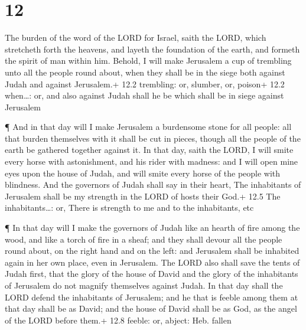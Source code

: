 \hypertarget{section-11}{%
\section{12}\label{section-11}}

 The burden of the word of the LORD for Israel, saith the
LORD, which stretcheth forth the heavens, and layeth the foundation of
the earth, and formeth the spirit of man within him. 
Behold, I will make Jerusalem a cup of trembling unto all the people
round about, when they shall be in the siege both against Judah and
against Jerusalem.+ 12.2 trembling: or, slumber, or, poison+ 12.2
when\ldots: or, and also against Judah shall he be which shall be in
siege against Jerusalem

 ¶ And in that day will I make Jerusalem a burdensome stone
for all people: all that burden themselves with it shall be cut in
pieces, though all the people of the earth be gathered together against
it.  In that day, saith the LORD, I will smite every horse
with astonishment, and his rider with madness: and I will open mine eyes
upon the house of Judah, and will smite every horse of the people with
blindness.  And the governors of Judah shall say in their
heart, The inhabitants of Jerusalem shall be my strength in the LORD of
hosts their God.+ 12.5 The inhabitants\ldots: or, There is strength to
me and to the inhabitants, etc

 ¶ In that day will I make the governors of Judah like an
hearth of fire among the wood, and like a torch of fire in a sheaf; and
they shall devour all the people round about, on the right hand and on
the left: and Jerusalem shall be inhabited again in her own place, even
in Jerusalem.  The LORD also shall save the tents of Judah
first, that the glory of the house of David and the glory of the
inhabitants of Jerusalem do not magnify themselves against Judah.
 In that day shall the LORD defend the inhabitants of
Jerusalem; and he that is feeble among them at that day shall be as
David; and the house of David shall be as God, as the angel of the LORD
before them.+ 12.8 feeble: or, abject: Heb. fallen

